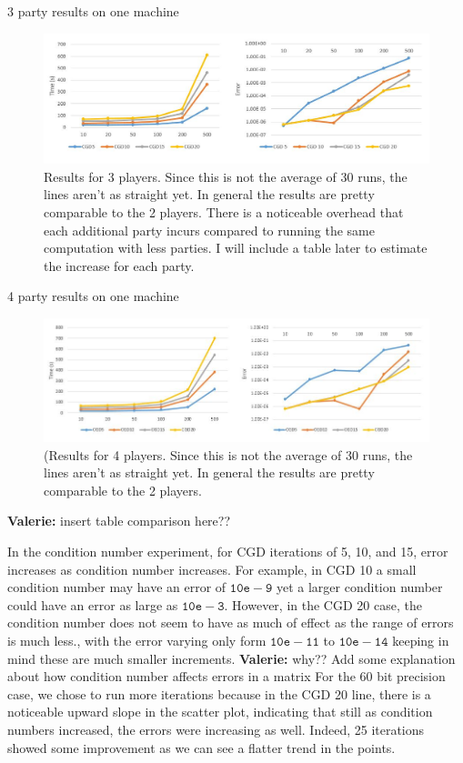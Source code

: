 \documentclass{article}
\theoremstyle{plain}
\theoremstyle{definition}
\theoremstyle{remark}
\newcommand{\vc}[1]{{\textcolor{lred}{\textbf{Valerie:} #1}}}
\begin{document}
3 party results on one machine

\begin{figure}[h]
  \includegraphics[width=\linewidth]{3players.jpg}
  \caption{Results for 3 players. Since this is not the average of 30 runs, the lines aren't as straight yet. In general the results are pretty comparable to the 2 players. There is a noticeable overhead that each additional party incurs compared to running the same computation with less parties. I will include a table later to estimate the increase for each party.}
  \label{fig:result4}
\end{figure}

4 party results on one machine

\begin{figure}[h]
  \includegraphics[width=\linewidth]{4players.jpg}
  \caption{(Results for 4 players. Since this is not the average of 30 runs, the lines aren't as straight yet. In general the results are pretty comparable to the 2 players. }
  \label{fig:result4}
\end{figure}

\vc{insert table comparison here??}

In the condition number experiment, for CGD iterations of 5, 10, and 15, error increases as condition number increases. For example, in CGD 10 a small condition number may have an error of $\mathtt{10e-9}$ yet a larger condition number could have an error as large as $\mathtt{10e-3}$. However, in the CGD 20 case, the condition number does not seem to have as much of effect as the range of errors is much less., with the error varying only form $\mathtt{10e-11}$ to $\mathtt{10e-14}$ keeping in mind these are much smaller increments. \vc{why?? Add some explanation about how condition number affects errors in a matrix} For the 60 bit precision case, we chose to run more iterations because in the CGD 20 line, there is a noticeable upward slope in the scatter plot, indicating that still as condition numbers increased, the errors were increasing as well. Indeed, 25 iterations showed some improvement as we can see a flatter trend in the points.
\end{document}
